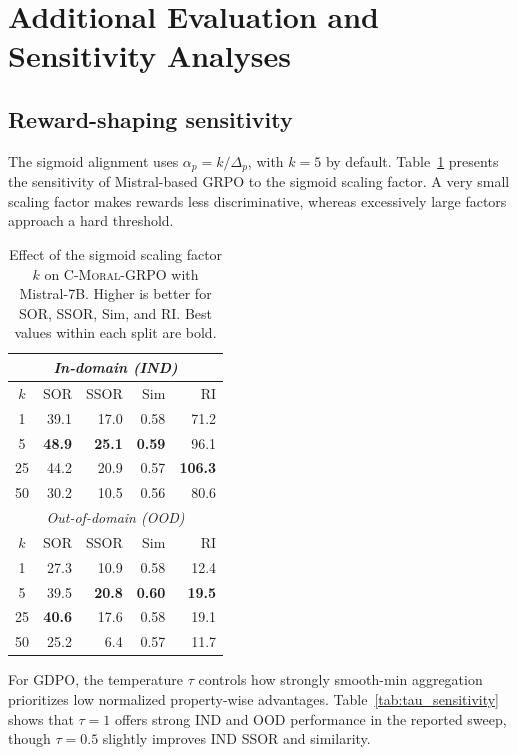 \section{Additional Evaluation and Sensitivity Analyses}
\label{appendix:sensitivity}

\subsection{Reward-shaping sensitivity}
The sigmoid alignment uses $\alpha_p=k/\Delta_p$, with $k=5$ by default. Table~\ref{tab:k_sensitivity} presents the sensitivity of Mistral-based GRPO to the sigmoid scaling factor. A very small scaling factor makes rewards less discriminative, whereas excessively large factors approach a hard threshold.

\begin{table}[t]
\centering
\caption{Effect of the sigmoid scaling factor $k$ on \textsc{C-Moral}-GRPO with Mistral-7B. Higher is better for SOR, SSOR, Sim, and RI. Best values within each split are bold.}
\label{tab:k_sensitivity}
\begingroup
\footnotesize
\setlength{\tabcolsep}{5pt}
\renewcommand{\arraystretch}{1.10}
\begin{tabular}{@{}c r r r r@{}}
\toprule
\multicolumn{5}{c}{\textit{In-domain (IND)}}\\
\midrule
$k$ & SOR & SSOR & Sim & RI\\
\midrule
1  & 39.1 & 17.0 & 0.58 & 71.2\\
5  & \textbf{48.9} & \textbf{25.1} & \textbf{0.59} & 96.1\\
25 & 44.2 & 20.9 & 0.57 & \textbf{106.3}\\
50 & 30.2 & 10.5 & 0.56 & 80.6\\
\midrule
\multicolumn{5}{c}{\textit{Out-of-domain (OOD)}}\\
\midrule
$k$ & SOR & SSOR & Sim & RI\\
\midrule
1  & 27.3 & 10.9 & 0.58 & 12.4\\
5  & 39.5 & \textbf{20.8} & \textbf{0.60} & \textbf{19.5}\\
25 & \textbf{40.6} & 17.6 & 0.58 & 19.1\\
50 & 25.2 & 6.4 & 0.57 & 11.7\\
\bottomrule
\end{tabular}
\endgroup
\end{table}

For GDPO, the temperature $\tau$ controls how strongly smooth-min aggregation prioritizes low normalized property-wise advantages. Table~\ref{tab:tau_sensitivity} shows that $\tau=1$ offers strong IND and OOD performance in the reported sweep, though $\tau=0.5$ slightly improves IND SSOR and similarity.

